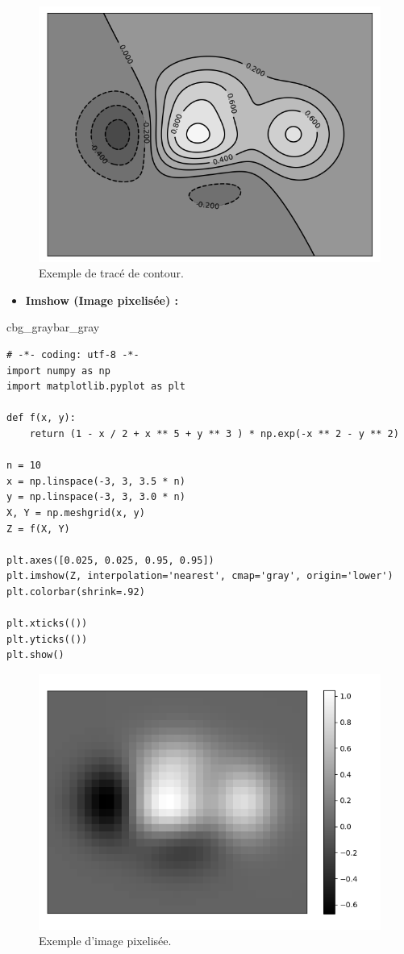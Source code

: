 \documentclass[%
oneside,                 %
final,                   %
10pt,french]{article}
\newenvironment{_pro_tight}[2]{
   \def\FrameCommand{\color{#2}\vrule width 1mm\normalcolor\colorbox{#1}}
   \FrameRule0.6pt\MakeFramed {\advance\hsize-2mm\FrameRestore}\vskip3mm}
   {\vskip0mm\endMakeFramed}
\newenvironment{pro}[2]{
\bgroup\rmfamily
\fboxsep=0mm\relax
\begin{_pro_tight}{#1}{#2}
\list{}{\parsep=-2mm\parskip=0mm\topsep=0pt\leftmargin=2mm
\rightmargin=2\leftmargin\leftmargin=4pt\relax}
\item\relax}
{\endlist\end{_pro_tight}\egroup}
\begin{document}
\begin{figure}[!ht]  %
  \centerline{\includegraphics[width=0.7\linewidth]{imgs/ContourPlot.png}}
  \caption{
  Exemple de tracé de contour. \label{fig:ContourPlot}
  }
\end{figure}


\begin{itemize}
\item \textbf{Imshow (Image pixelisée) :}
\end{itemize}

\noindent
\begin{pro}{cbg_gray}{bar_gray}\begin{verbatim}
# -*- coding: utf-8 -*-
import numpy as np
import matplotlib.pyplot as plt

def f(x, y):
    return (1 - x / 2 + x ** 5 + y ** 3 ) * np.exp(-x ** 2 - y ** 2)

n = 10
x = np.linspace(-3, 3, 3.5 * n)
y = np.linspace(-3, 3, 3.0 * n)
X, Y = np.meshgrid(x, y)
Z = f(X, Y)

plt.axes([0.025, 0.025, 0.95, 0.95])
plt.imshow(Z, interpolation='nearest', cmap='gray', origin='lower')
plt.colorbar(shrink=.92)

plt.xticks(())
plt.yticks(())
plt.show()
\end{verbatim}
\end{pro}
\noindent


\begin{figure}[!ht]  %
  \centerline{\includegraphics[width=0.7\linewidth]{imgs/Imshow.png}}
  \caption{
  Exemple d'image pixelisée. \label{fig:CImshow}
  }
\end{figure}
\end{document}
